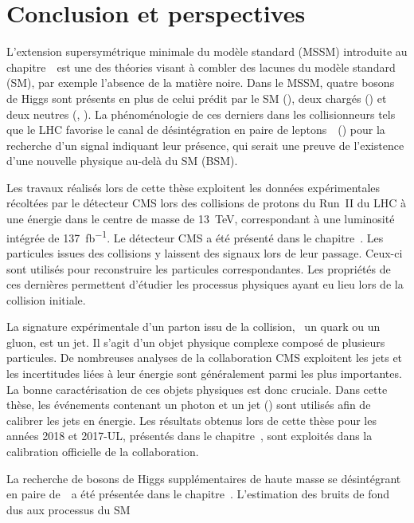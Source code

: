 \chapter*{Conclusion et perspectives}\label{chapter-conclusion}

L'extension supersymétrique minimale du modèle standard (MSSM)
introduite au chapitre~\
est une des théories visant à combler des lacunes du modèle standard (SM),
par exemple l'absence de la matière noire.
Dans le MSSM,
quatre bosons de Higgs sont présents en plus de celui prédit par le SM (\higgs),
deux chargés (\Higgspm)
et
deux neutres (\Higgs, \HiggsA).
La phénoménologie de ces derniers dans les collisionneurs tels que le LHC
favorise le canal de désintégration en paire de leptons~\tau\
(\HAtoTauTau)
pour la recherche d'un signal indiquant leur présence,
qui serait une preuve de l'existence d'une nouvelle physique
au-delà du SM (BSM).
\par
Les travaux réalisés lors de cette thèse
exploitent les données expérimentales
récoltées par le détecteur CMS
lors des collisions de protons du Run~II du LHC
à une énergie dans le centre de masse de \SI{13}{\TeV},
correspondant à une luminosité intégrée de \SI{137}{\femto\barn^{-1}}.
Le détecteur CMS a été présenté dans le chapitre~.
Les particules issues des collisions y laissent des signaux lors de leur passage.
Ceux-ci sont utilisés pour reconstruire les particules correspondantes.
Les propriétés de ces dernières permettent d'étudier les processus physiques
ayant eu lieu lors de la collision initiale.
\par
La signature expérimentale
d'un parton issu de la collision, \ie\ un quark ou un gluon,
est un jet.
Il s'agit d'un objet physique complexe
composé de plusieurs particules.
De nombreuses analyses de la collaboration CMS exploitent les jets
et
les incertitudes liées à leur énergie sont généralement parmi les plus importantes.
La bonne caractérisation de ces objets physiques est donc cruciale.
Dans cette thèse,
les événements contenant un photon et un jet (\Gjet)
sont utilisés afin de calibrer les jets en énergie.
Les résultats obtenus lors de cette thèse pour les années 2018 et 2017-UL,
présentés dans le chapitre~\refChJERC,
sont exploités dans la calibration officielle de la collaboration.
\par
La recherche de bosons de Higgs supplémentaires de haute masse se désintégrant en paire de~\tau\
a été présentée dans le chapitre~.
L'estimation des bruits de fond dus aux processus du SM
